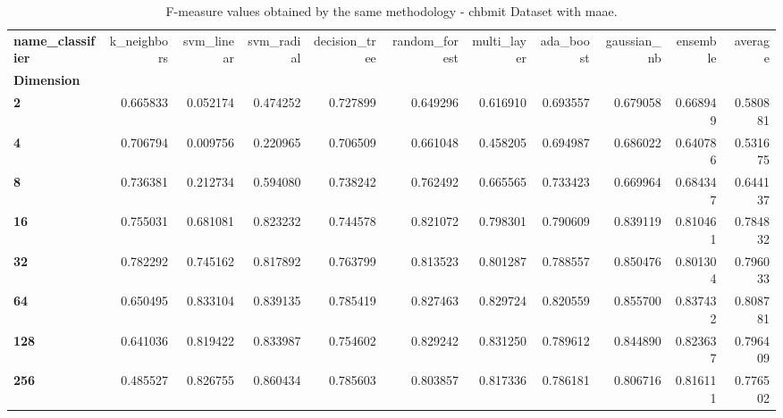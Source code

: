 \begin{table}
\centering
\caption{F-measure values obtained by the same methodology - chbmit Dataset with maae.}
\label{f-measure_chbmit_maae-reproduction}
\begin{tabular}{lrrrrrrrrrr}
\toprule
\textbf{name\_classifier} &  k\_neighbors &  svm\_linear &  svm\_radial &  decision\_tree &  random\_forest &  multi\_layer &  ada\_boost &  gaussian\_nb &  ensemble &   average \\
\textbf{Dimension} &              &             &             &                &                &              &            &              &           &           \\
\midrule
\textbf{2        } &     0.665833 &    0.052174 &    0.474252 &       0.727899 &       0.649296 &     0.616910 &   0.693557 &     0.679058 &  0.668949 &  0.580881 \\
\textbf{4        } &     0.706794 &    0.009756 &    0.220965 &       0.706509 &       0.661048 &     0.458205 &   0.694987 &     0.686022 &  0.640786 &  0.531675 \\
\textbf{8        } &     0.736381 &    0.212734 &    0.594080 &       0.738242 &       0.762492 &     0.665565 &   0.733423 &     0.669964 &  0.684347 &  0.644137 \\
\textbf{16       } &     0.755031 &    0.681081 &    0.823232 &       0.744578 &       0.821072 &     0.798301 &   0.790609 &     0.839119 &  0.810461 &  0.784832 \\
\textbf{32       } &     0.782292 &    0.745162 &    0.817892 &       0.763799 &       0.813523 &     0.801287 &   0.788557 &     0.850476 &  0.801304 &  0.796033 \\
\textbf{64       } &     0.650495 &    0.833104 &    0.839135 &       0.785419 &       0.827463 &     0.829724 &   0.820559 &     0.855700 &  0.837432 &  0.808781 \\
\textbf{128      } &     0.641036 &    0.819422 &    0.833987 &       0.754602 &       0.829242 &     0.831250 &   0.789612 &     0.844890 &  0.823637 &  0.796409 \\
\textbf{256      } &     0.485527 &    0.826755 &    0.860434 &       0.785603 &       0.803857 &     0.817336 &   0.786181 &     0.806716 &  0.816111 &  0.776502 \\
\bottomrule
\end{tabular}
\end{table}
